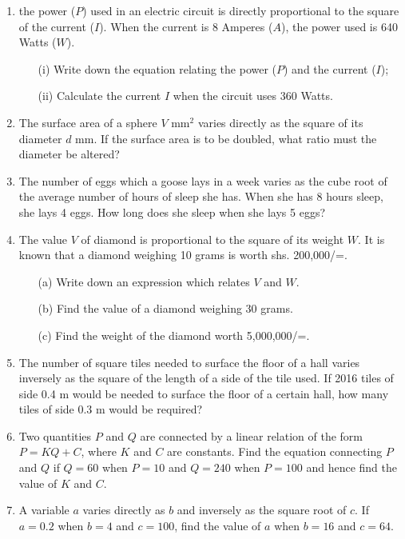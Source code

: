 \begin{enumerate}
	\item the power ($P$) used in an electric circuit is directly proportional to the square of the current ($I$). When the current is 8 Amperes ($A$), the power used is 640 Watts ($W$).
		\begin{itemize}
		\item[(i)] Write down the equation relating the power ($P$) and the current ($I$);
		\item[(ii)] Calculate the current $I$ when the circuit uses 360 Watts.
		\end{itemize}
	
	\item The surface area of a sphere $V$ mm$^2$ varies directly as the square of its diameter $d$ mm. If the surface area is to be doubled, what ratio must the diameter be altered?
	
	\item The number of eggs which a goose lays in a week varies as the cube root of the average number of hours of sleep she has. When she has 8 hours sleep, she lays 4 eggs. How long does she sleep when she lays 5 eggs?
	
	\item The value $V$ of diamond is proportional to the square of its weight $W$. It is known that a diamond weighing 10 grams is worth shs. 200,000/=.
		\begin{itemize}
		
	\item[(a)] Write down an expression which relates $V$ and $W$.
	\item[(b)] Find the value of a diamond weighing 30 grams.
	\item[(c)] Find the weight of the diamond worth 5,000,000/=.
		\end{itemize}
		
	\item The number of square tiles needed to surface the floor of a hall varies inversely as the square of the length of a side of the tile used. If 2016 tiles of side 0.4 m would be needed to surface the floor of a certain hall, how many tiles of side 0.3 m would be required?
	
	\item Two quantities $P$ and $Q$ are connected by a linear relation of the form $P = KQ + C$, where $K$ and $C$ are constants. Find the equation connecting $P$ and $Q$ if $Q = 60$ when $P = 10$ and $Q = 240$ when $P = 100$ and hence find the value of $K$ and $C$.
	
	\item A variable $a$ varies directly as $b$ and inversely as the square root of $c$. If $a = 0.2$ when $b = 4$ and $c = 100$, find the value of $a$ when $b = 16$ and $c = 64$.
	

\end{enumerate}
